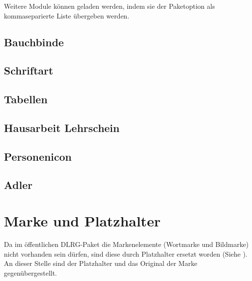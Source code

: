 \documentclass[
    a4paper,
    12pt,
    parskip=half,
    bibliography=totoc,
]{scrartcl}
\begin{document}
    \begin{options}
        \Default Weitere Module können geladen werden, indem sie der Paketoption  als kommaseparierte Liste übergeben werden.
    \end{options}


    \subsection{Bauchbinde}
        

    \subsection{Schriftart}
        

    \subsection{Tabellen}
        

    \subsection{Hausarbeit Lehrschein}
        

    \subsection{Personenicon}
        

    \subsection{Adler}
        

\appendix

\section{Marke und Platzhalter}\label{sec:platzhalter}
    Da im öffentlichen DLRG-Paket die Markenelemente (Wortmarke und Bildmarke) nicht vorhanden sein dürfen, sind diese durch Platzhalter ersetzt worden (Siehe ). An dieser Stelle sind der Platzhalter und das Original der Marke gegenübergestellt.
\end{document}
